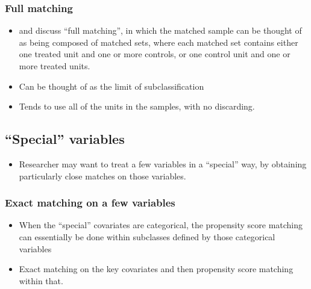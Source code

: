 \documentclass[11pt,titlepage]{article}
\begin{document}
\subsubsection{Full matching}
\begin{itemize}
\item \cite{Rosenbaum91a} and \cite{Hansen03} discuss ``full matching'', in which the matched sample can be
thought of as being composed of matched sets, where each matched set contains either one treated unit and one or more controls, or one control unit and one or more
treated units.  
\item Can be thought of as the limit of subclassification 
\item Tends to use all of the units in the samples, with no discarding.
\end{itemize}

\subsection{``Special'' variables}
\begin{itemize} 
\item Researcher may want to treat a few variables in a ``special'' way, by obtaining particularly close matches on those variables.
\end{itemize}

\subsubsection{Exact matching on a few variables}
\begin{itemize}
\item When the ``special'' covariates are categorical, the propensity score matching can essentially be done within subclasses defined by those categorical variables
\item Exact matching on the key covariates and then propensity score matching within that.
\end{itemize}
\end{document}
